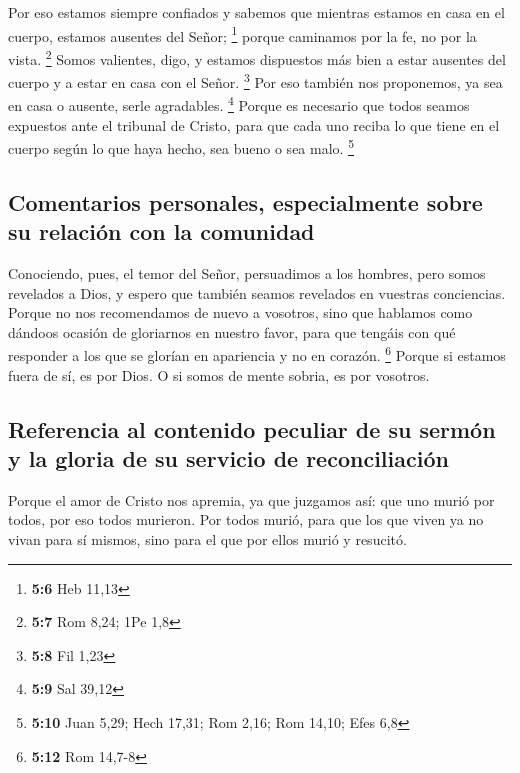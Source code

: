  Por eso estamos siempre confiados y sabemos que mientras
estamos en casa en el cuerpo, estamos ausentes del Señor; \footnote{\textbf{5:6}
  Heb 11,13}  porque caminamos por la fe, no por la vista.
\footnote{\textbf{5:7} Rom 8,24; 1Pe 1,8}  Somos
valientes, digo, y estamos dispuestos más bien a estar ausentes del
cuerpo y a estar en casa con el Señor. \footnote{\textbf{5:8} Fil 1,23}
 Por eso también nos proponemos, ya sea en casa o ausente,
serle agradables. \footnote{\textbf{5:9} Sal 39,12} 
Porque es necesario que todos seamos expuestos ante el tribunal de
Cristo, para que cada uno reciba lo que tiene en el cuerpo según lo que
haya hecho, sea bueno o sea malo. \footnote{\textbf{5:10} Juan 5,29;
  Hech 17,31; Rom 2,16; Rom 14,10; Efes 6,8}

\hypertarget{comentarios-personales-especialmente-sobre-su-relaciuxf3n-con-la-comunidad}{%
\subsection{Comentarios personales, especialmente sobre su relación con
la
comunidad}\label{comentarios-personales-especialmente-sobre-su-relaciuxf3n-con-la-comunidad}}

 Conociendo, pues, el temor del Señor, persuadimos a los
hombres, pero somos revelados a Dios, y espero que también seamos
revelados en vuestras conciencias.  Porque no nos
recomendamos de nuevo a vosotros, sino que hablamos como dándoos ocasión
de gloriarnos en nuestro favor, para que tengáis con qué responder a los
que se glorían en apariencia y no en corazón. \footnote{\textbf{5:12}
  Rom 14,7-8}  Porque si estamos fuera de sí, es por
Dios. O si somos de mente sobria, es por vosotros.

\hypertarget{referencia-al-contenido-peculiar-de-su-sermuxf3n-y-la-gloria-de-su-servicio-de-reconciliaciuxf3n}{%
\subsection{Referencia al contenido peculiar de su sermón y la gloria de
su servicio de
reconciliación}\label{referencia-al-contenido-peculiar-de-su-sermuxf3n-y-la-gloria-de-su-servicio-de-reconciliaciuxf3n}}

 Porque el amor de Cristo nos apremia, ya que juzgamos
así: que uno murió por todos, por eso todos murieron. 
Por todos murió, para que los que viven ya no vivan para sí mismos, sino
para el que por ellos murió y resucitó.

